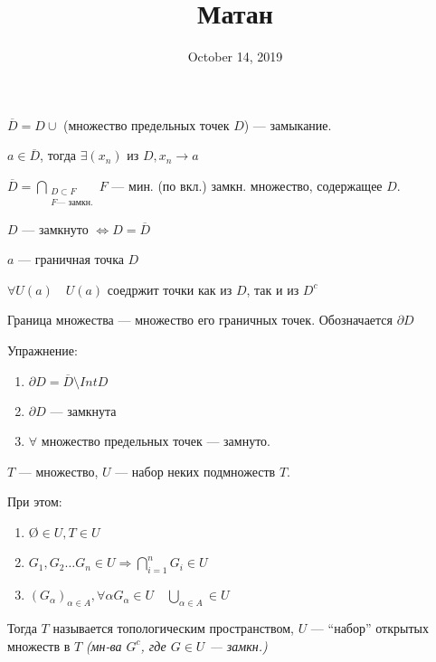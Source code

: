 

\title{Матан}

\date{October 14, 2019}



\maketitle
 
\noindent
$\overline D=D\cup $ (множество предельных точек $D$) --- замыкание.

\begin{remark}
$a\in\overline D$, тогда $\exists (x_n)$ из $D, x_n\to a$
\end{remark}

\begin{remark}
$\overline D = \bigcap\limits_{\substack{D\subset F \\ F \text{--- замкн.}}} F$ --- мин. (по вкл.) замкн. множество, содержащее $D$.
\end{remark}

\begin{remark}
$D$ --- замкнуто $\Leftrightarrow D=\overline D$
\end{remark}

\begin{definition}
$a$ --- граничная точка $D$

$\forall U(a) \quad U(a)$ соедржит точки как из $D$, так и из $D^c$
\end{definition}

\begin{definition}
Граница множества --- множество его граничных точек. Обозначается $\partial D$
\end{definition}

Упражнение:
\begin{enumerate}
    \item $\partial D=\overline D \setminus IntD$
    \item $\partial D$ --- замкнута
    \item $\forall$ множество предельных точек --- замнуто.
\end{enumerate}

\begin{definition}
$T$ --- множество, $U$ --- набор неких подмножеств $T$.

При этом: \begin{enumerate}
    \item \O$\in U, T\in U$
    \item $G_1,G_2\ldots G_n\in U \Rightarrow \bigcap\limits_{i=1}^n G_i\in U$
    \item $(G_\alpha)_{\alpha\in A}, \forall \alpha G_\alpha\in U \quad \bigcup\limits_{\alpha\in A}\in U$
\end{enumerate}
Тогда $T$ называется топологическим пространством, $U$ --- ``набор'' открытых множеств в $T$ \textit{(мн-ва $G^c$, где $G\in U$ --- замкн.)}
\end{definition}

